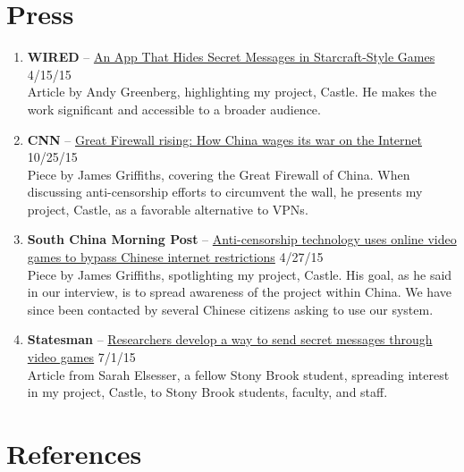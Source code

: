 \documentclass[11pt,a4paper,sans]{moderncv}        %
\begin{document}
\section{Press}
\begin{enumerate}
	\item \textbf{WIRED} -- \href{http://www.wired.com/2015/04/app-hides-secret-messages-starcraft-style-games/}{\color{blue}An App That Hides Secret Messages in Starcraft-Style Games} 4/15/15 \\
	Article by Andy Greenberg, highlighting my project, Castle. He makes the work significant and accessible to a broader audience.
	\item \textbf{CNN} -- \href{http://www.cnn.com/2015/10/25/asia/china-war-internet-great-firewall/}{\color{blue}Great Firewall rising: How China wages its war on the Internet} 10/25/15\\
	Piece by James Griffiths, covering the Great Firewall of China. When discussing anti-censorship efforts to circumvent the wall, he presents my project, Castle, as a favorable alternative to VPNs.
	\item \textbf{South China Morning Post} -- \href{http://www.scmp.com/tech/apps-gaming/article/1775587/anti-censorship-technology-uses-online-video-games-bypass-chinese}{\color{blue}Anti-censorship technology uses online video games	to bypass Chinese internet restrictions} 4/27/15\\
	Piece by James Griffiths, spotlighting my project, Castle. His goal, as he said in our interview, is to spread awareness of the project within China. We have since been contacted by several Chinese citizens asking to use our system.
	\item \textbf{Statesman} -- \href{http://sbstatesman.com/2015/07/01/researchers-develop-a-way-to-send-secret-messages-through-video-games/}{\color{blue}Researchers develop a way to send secret messages through video games} 7/1/15 \\
	Article from Sarah Elsesser, a fellow Stony Brook student, spreading interest in my project, Castle, to Stony Brook students, faculty, and staff.
\end{enumerate}

\section{References}
\begin{cvcolumns}
	\hspace{-3cm}
\end{cvcolumns}

\clearpage
\end{document}
